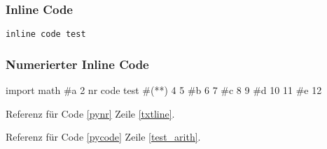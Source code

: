 \subsubsection*{Inline Code}
\begin{lstlisting}[caption=CAP]
inline code test
\end{lstlisting}

\vspace{4ex}
\subsubsection*{Numerierter Inline Code}
\begin{nrcode}[caption=CCC, label=pynr, linerange={a-c, d-e}]
import math
#\*a
2
nr code test #(*\label{txtline}*)
4
5
#\*b
6
7
#\*c
8
9
#\*d
10
11
#\*e
12
\end{nrcode}

Referenz für Code \ref{pynr} Zeile \ref{txtline}.

Referenz für Code \ref{pycode} Zeile \ref{test_arith}.
